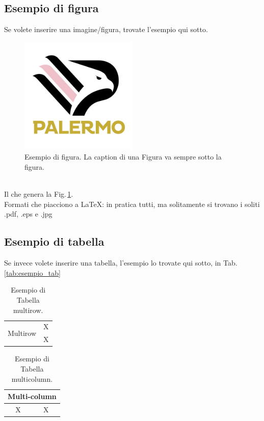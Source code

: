 \subsection{Esempio di figura}\label{subsec:esempio_figura}
Se volete inserire una imagine/figura, trovate l'esempio qui sotto.
\begin{figure}[h]
    \centering
    \includegraphics[width=0.5\textwidth]{Figure/esempio.jpg}
    \caption{Esempio di figura. La caption di una Figura va sempre sotto la figura.}
    \label{fig:esempio_fig}
\end{figure}\\
Il che genera la Fig.\,\ref{fig:esempio_fig}.\\
Formati che piacciono a LaTeX: in pratica tutti, ma solitamente si trovano i soliti .pdf, .eps e .jpg

\subsection{Esempio di tabella}\label{subsec:esempio_tabella}
Se invece volete inserire una tabella, l'esempio lo trovate qui sotto, in Tab.\,\ref{tab:esempio_tab}



\begin{table}[ht]
\centering
    \caption{Esempio di Tabella multirow.}
    \label{tab:esempio_tab_multirow}
    \begin{tabular}{cc}
    \toprule
    \multirow{2}{*}{Multirow}&X\\
    &X\\
    \bottomrule
    \end{tabular}
\end{table}

\begin{table}[!ht]
\centering
    \caption{Esempio di Tabella multicolumn.}
    \label{tab:esempio_tab_multicolumn}
    \begin{tabular}{cc}
    \toprule
    \multicolumn{2}{c}{Multi-column}\\
    \midrule
    X&X\\
    \bottomrule
    \end{tabular}
\end{table}